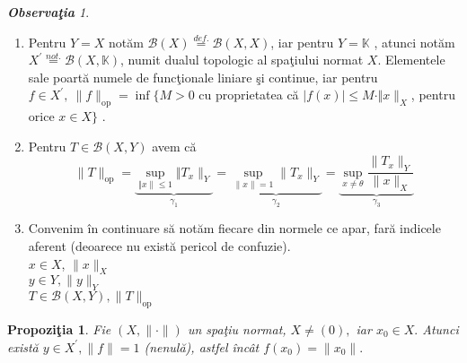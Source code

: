 \documentclass[ a4paper, 12pt]{report}
\newtheorem{prop}[theorem]{\bf Propozi\c tia }
\theoremstyle{definition}
\theoremstyle{remark}
\newtheorem{obs}{\bf Observa\c tia }[section]
\numberwithin{equation}{section}
\begin{document}
\begin{obs}
\begin{enumerate}
\item Pentru $Y = X$ not\u am $\mathcal{B}(X) \stackrel{def.}{=} \mathcal{B}(X,X)$, iar pentru $Y = \mathbb{K}$ , atunci not\u am $X^{'}\stackrel{not.}{=} \mathcal{B}(X,\mathbb{K})$, numit dualul topologic al spa\c tiului normat $X$.
Elementele sale poart\u a numele de func\c tionale liniare \c si continue, iar pentru $f \in X^{'},\   \lVert f \rVert_{\mbox{op}} = \inf \{ M >0$ cu proprietatea c\u  a $\lvert f(x) \rvert \leq M \cdot \Vert x \rVert_{X}$,  pentru orice $x \in X\}$ .
\item Pentru $T \in \mathcal{B}(X,Y)$ avem c\u a
\[ \lVert  T \rVert_{\mbox{op}} = \underbrace{\sup\limits_{\Vert x \rVert \leq 1} \Vert T_x \rVert_{Y}}_{\gamma_1} = \underbrace{\sup\limits_{\lVert x \rVert = 1} \lVert T_x \rVert_{Y}}_{\gamma_2} = \underbrace{\sup\limits_{x \neq \theta} \frac{\lVert T_x \rVert_{Y}}{\lVert x \rVert_{X}}}_{\gamma_3} \]
\item Convenim \^in continuare s\u a not\u am fiecare din normele ce apar, far\u a indicele aferent (deoarece nu exist\u a pericol de confuzie).\\
$x \in X$, $\lVert x \rVert_{X}$\\
$y \in Y, \lVert y \rVert_{Y}$\\
$T \in \mathcal{B}(X,Y), \lVert T \rVert_{\mbox{op}}$
\end{enumerate}
\end{obs}
\begin{prop}\label{p125}
Fie $(X, \lVert \cdot \rVert)$ un spa\c tiu normat, $X \neq (0),$ iar $x_0 \in X.$ Atunci exist\u a $y \in X^{'}, \lVert f \rVert = 1$ (nenul\u a), astfel \^inc\^at $f(x_0) = \lVert x_0 \rVert.$
\end{prop}
\end{document}
